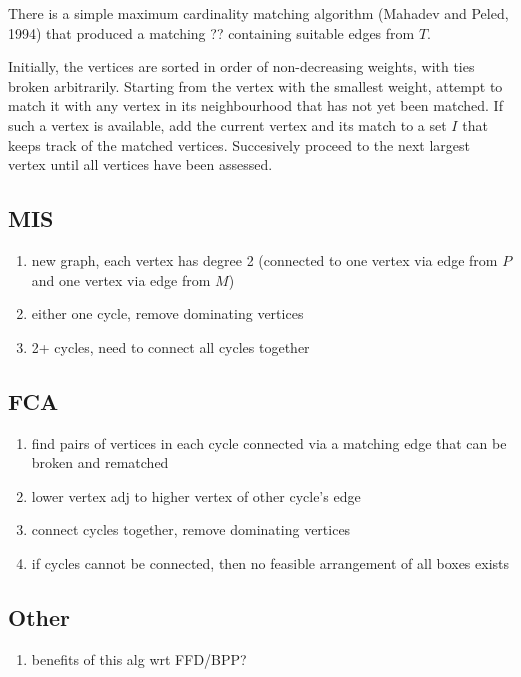 \documentclass{llncs}
\begin{document}
There is a simple maximum cardinality matching algorithm (Mahadev and Peled, 1994) that produced a matching ?? containing suitable edges from $T$.

Initially, the vertices are sorted in order of non-decreasing weights, with ties broken arbitrarily. Starting from the vertex with the smallest weight, attempt to match it with any vertex in its neighbourhood that has not yet been matched. If such a vertex is available, add the current vertex and its match to a set $I$ that keeps track of the matched vertices. Succesively proceed to the next largest vertex until all vertices have been assessed.



\subsection{MIS}
\begin{enumerate}
	\item new graph, each vertex has degree 2 (connected to one vertex via edge from $P$ and one vertex via edge from $M$)
	\item either one cycle, remove dominating vertices
	\item 2+ cycles, need to connect all cycles together
\end{enumerate}


\subsection{FCA}
\begin{enumerate}
	\item find pairs of vertices in each cycle connected via a matching edge that can be broken and rematched
	\item lower vertex adj to higher vertex of other cycle's edge
	\item connect cycles together, remove dominating vertices
	\item if cycles cannot be connected, then no feasible arrangement of all boxes exists
\end{enumerate}

\subsection{Other}
\begin{enumerate}
	\item benefits of this alg wrt FFD/BPP?
\end{enumerate}
\end{document}
